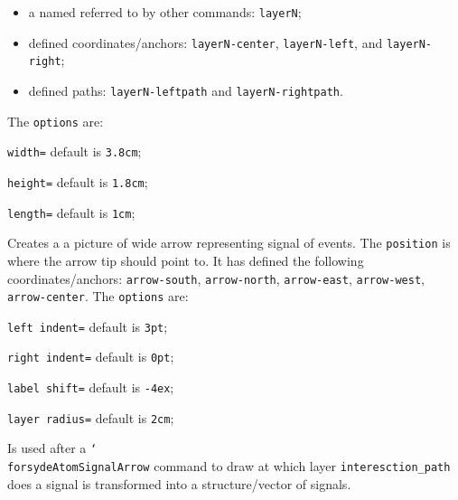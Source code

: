 \begin{itemize}
\item a named referred to by other commands: \texttt{layerN};
\item defined coordinates/anchors: \texttt{layerN-center}, \texttt{layerN-left}, and \texttt{layerN-right};
\item defined paths: \texttt{layerN-leftpath} and \texttt{layerN-rightpath}.
\end{itemize}

\noindent The \texttt{options} are:

\begin{optionslist}
\item \texttt{width=} default is \texttt{3.8cm};
\item \texttt{height=} default is \texttt{1.8cm};
\item \texttt{length=} default is \texttt{1cm};
\end{optionslist}

\hspace{1pt}

\noindent Creates a a picture of wide arrow representing signal of events. The \texttt{position} is where the arrow tip should point to. It has defined the following coordinates/anchors: \texttt{arrow-south}, \texttt{arrow-north}, \texttt{arrow-east}, \texttt{arrow-west}, \texttt{arrow-center}. The \texttt{options} are:

\begin{optionslist}
\item \texttt{left indent=} default is \texttt{3pt};
\item \texttt{right indent=} default is \texttt{0pt};
\item \texttt{label shift=} default is \texttt{-4ex};
\item \texttt{layer radius=} default is \texttt{2cm};
\end{optionslist}

\hspace{1pt}

\noindent Is used after a \texttt{\char`\\forsydeAtomSignalArrow} command to draw at which layer \texttt{interesction\_path} does a signal is transformed into a structure/vector of signals.

